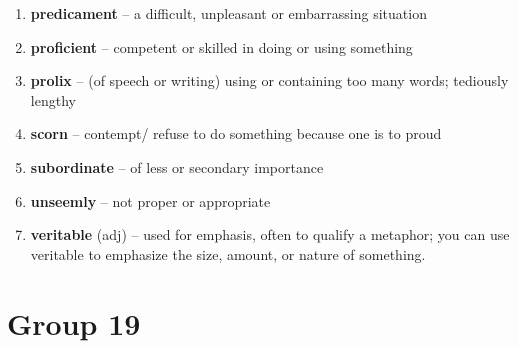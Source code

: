 \begin{enumerate}[wide,labelindent=0pt]
\item \textbf{predicament} -- a difficult, unpleasant or embarrassing situation
\item \textbf{proficient} -- competent or skilled in doing or using something
\item \textbf{prolix} – (of speech or writing) using or containing too many words; tediously lengthy
\item \textbf{scorn} -- contempt/ refuse to do something because one is to proud
\item \textbf{subordinate} -- of less or secondary importance
\item \textbf{unseemly} -- not proper or appropriate
\item \textbf{veritable} (adj) -- used for emphasis, often to qualify a metaphor; you can use veritable to emphasize the size, amount, or nature of something.
\end{enumerate}

\newpage
\section{Group 19}

